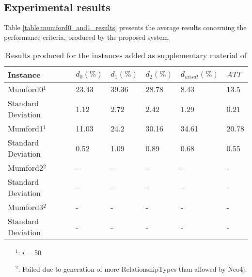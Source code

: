 \subsection{Experimental results}
\label{subsec:scalabilityExperiments_results}


Table \vref{table:mumford0_and1_results} presents the average results concerning the performance criteria, produced by the proposed system.

\begin{table}[H]
    \centering
    \hspace*{-1.0cm}
    \begin{tabular}{|l|l|l|l|l|l|}
        \hline
        \textbf{Instance} & $d_0(\%)$ & $d_1(\%)$ & $d_2(\%)$ & $d_{unsat}(\%)$ & $ATT$\\
        \hline
        Mumford0$^1$ & 23.43 & 39.36 & 28.78 & 8.43 & 13.5\\
        Standard Deviation & 1.12 & 2.72 & 2.42 & 1.29 & 0.21\\
        \hline
        Mumford1$^1$ & 11.03 & 24.2 & 30.16 & 34.61 & 20.78\\
        Standard Deviation & 0.52 & 1.09 & 0.89 & 0.68 & 0.55\\
        \hline
        Mumford2$^2$ & - & - & - & - & - \\
        Standard Deviation & - & - & - & - & -\\
        \hline
        Mumford3$^2$ & - & - & - & - & - \\
        Standard Deviation & - & - & - & - & -\\
        \hline
    \end{tabular}
    \caption{Results produced for the instances added as supplementary material of \citet{mumford13}}
    \tiny
    \begin{itemize}[noitemsep]
    \item[$^1$:] $i$ = 50
    \item[$^2$:] Failed due to generation of more RelationshipTypes than allowed by Neo4j.
    \end{itemize}
    \label{table:mumford0_and1_results}
\end{table}

